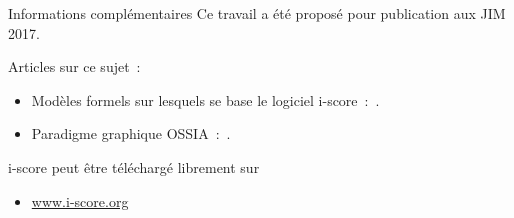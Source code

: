 \begin{block}{Informations complémentaires}
	Ce travail a été proposé pour publication aux JIM 2017.
      {Articles sur ce sujet~:
      \begin{itemize}
        \item Modèles formels sur lesquels se base le logiciel i-score~:~\cite{allombert_system_2007,arias2016authoring}.
        \item Paradigme graphique OSSIA~:~\cite{celerier2015ossia}.
      \end{itemize}
      \vspace{0.1in}\noindent i-score peut être téléchargé librement sur
      \begin{itemize}
        \item \url{www.i-score.org}
      \end{itemize}}
\end{block}